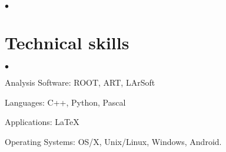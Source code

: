 \documentclass[margin,line]{res}
\newenvironment{list2}{
  \begin{list}{$\bullet$}{%
      \setlength{\itemsep}{0in}
      \setlength{\parsep}{0in} \setlength{\parskip}{0in}
      \setlength{\topsep}{0in} \setlength{\partopsep}{0in} 
      \setlength{\leftmargin}{0.2in}}}{\end{list}}
\begin{document}
\begin{resume}
\begin{list2}
\end{list2}


\section{\sc Technical skills} 
\begin{list2}
\item Analysis Software: ROOT, ART, LArSoft
\item Languages: C++, Python, Pascal
\item Applications:  \LaTeX
\item Operating Systems:  OS/X, Unix/Linux, Windows, Android.


\end{list2}


\newpage





\end{resume}
\end{document}
